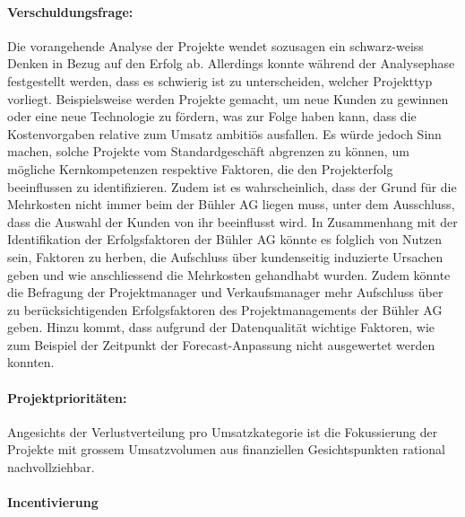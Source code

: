 \paragraph{Verschuldungsfrage:} Die vorangehende Analyse der Projekte wendet sozusagen ein schwarz-weiss Denken in Bezug auf den Erfolg ab. Allerdings konnte während der Analysephase festgestellt werden, dass es schwierig ist zu unterscheiden, welcher Projekttyp vorliegt. Beispielsweise werden Projekte gemacht, um neue Kunden zu gewinnen oder eine neue Technologie zu fördern, was zur Folge haben kann, dass die Kostenvorgaben relative zum Umsatz ambitiös ausfallen. Es würde jedoch Sinn machen, solche Projekte vom Standardgeschäft abgrenzen zu können, um mögliche Kernkompetenzen respektive Faktoren, die den Projekterfolg beeinflussen zu identifizieren. Zudem ist es wahrscheinlich, dass der Grund für die Mehrkosten nicht immer beim der Bühler AG liegen muss, unter dem Ausschluss, dass die Auswahl der Kunden von ihr beeinflusst wird. In Zusammenhang mit der Identifikation der Erfolgsfaktoren der Bühler AG könnte es folglich von Nutzen sein, Faktoren zu herben, die Aufschluss über kundenseitig induzierte Ursachen geben und wie anschliessend die Mehrkosten gehandhabt wurden. Zudem könnte die Befragung der Projektmanager und Verkaufsmanager mehr Aufschluss über zu berücksichtigenden Erfolgsfaktoren des Projektmanagements der Bühler AG geben. Hinzu kommt, dass aufgrund der Datenqualität wichtige Faktoren, wie zum Beispiel der Zeitpunkt der Forecast-Anpassung nicht ausgewertet werden konnten.
\paragraph{Projektprioritäten:} Angesichts der Verlustverteilung pro Umsatzkategorie ist die Fokussierung der Projekte mit grossem Umsatzvolumen aus finanziellen Gesichtspunkten rational nachvollziehbar.
\paragraph{Incentivierung}


